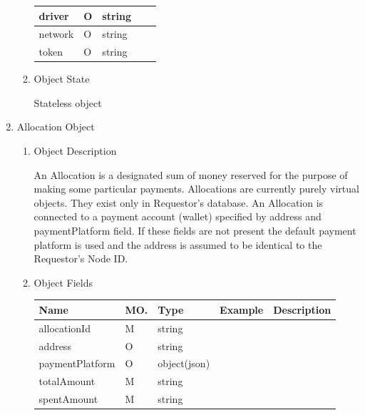 \begin{enumerate}
\begin{enumerate}
\begin{center}
\begin{tabular}{|p{3cm}|l|p{3cm}|p{3cm}|p{4cm}|}
driver		& O & string				&							& 							\\
\hline
network		& O & string				&							& 							\\
\hline
token		& O & string				&							& 							\\
\hline

\end{tabular}
\end{center}

\item Object State

Stateless object

\end{enumerate}


\item Allocation Object

\begin{enumerate}

\item Object Description

An Allocation is a designated sum of money reserved for the purpose of making some particular payments. 
Allocations are currently purely virtual objects. 
They exist only in Requestor's database. 
An Allocation is connected to a payment account (wallet) specified by address and paymentPlatform field. 
If these fields are not present the default payment platform is used and the address is assumed to be 
identical to the Requestor's Node ID.

\item Object Fields

\begin{center}
\begin{tabular}{|p{3cm}|l|p{3cm}|p{3cm}|p{4cm}|} 
\hline
\rowcolor{lightgray}	Name	& MO.	& Type	& Example & 	Description \\
\hline

allocationId			& M & string 				&							&  \\
\hline

address					& O & string 				&							&  \\
\hline

paymentPlatform			& O & object(json)			&							&	\\
\hline

totalAmount				& M & string 				&							&  \\
\hline

spentAmount				& M & string 				&							&  \\
\hline


\end{tabular}
\end{center}
\end{enumerate}
\end{enumerate}
